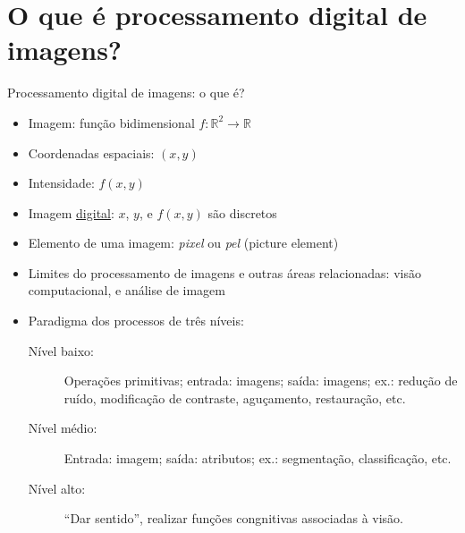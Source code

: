    \section[ slide = true]{O que é processamento digital de imagens?}
      \begin{slide}[toc=]{Processamento digital de imagens: o que é?}
         \begin{itemize}
            \item Imagem: função bidimensional $f:\mathbb{R}^2\rightarrow \mathbb{R}$ 
            \item Coordenadas espaciais: $(x,y)$
            \item Intensidade: $f(x,y)$
            \item Imagem \underline{digital}: $x$, $y$, e $f(x,y)$ são discretos
            \item Elemento de uma imagem: \emph{pixel} ou \emph{pel} (picture element)
            \item Limites do processamento de imagens e outras áreas relacionadas: visão computacional, e análise de imagem
            \item Paradigma dos processos de três níveis:
            \begin{description}
               \item [Nível baixo:]Operações primitivas; entrada: imagens; saída: imagens; ex.: redução de ruído, modificação de contraste, aguçamento, restauração, etc.
               \item [Nível médio:]Entrada: imagem; saída: atributos; ex.: segmentação, classificação, etc.
               \item [Nível alto:] ``Dar sentido'', realizar funções congnitivas associadas à visão. 
            \end{description}
         \end{itemize}
      \end{slide}

